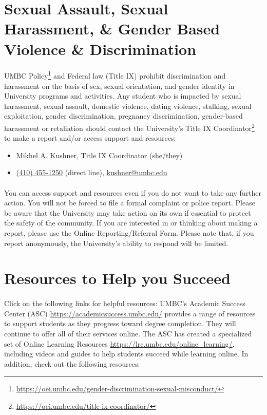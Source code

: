 \documentclass[letter,10pt]{article}
\begin{document}
\section*{Sexual Assault, Sexual Harassment, \& Gender Based Violence \& Discrimination}
\paragraph{}UMBC Policy\footnote{\url{https://oei.umbc.edu/gender-discrimination-sexual-misconduct/}} and Federal law (Title IX) prohibit discrimination and harassment on the basis of sex, sexual orientation, and gender identity in University programs and activities. Any student who is impacted by sexual harassment, sexual assault, domestic violence, dating violence, stalking, sexual exploitation, gender discrimination, pregnancy discrimination, gender-based harassment or retaliation should contact the University’s Title IX Coordinator\footnote{\url{https://oei.umbc.edu/title-ix-coordinator/}} to make a report and/or access support and resources:
\begin{itemize}
\item Mikhel A. Kushner, Title IX Coordinator (she/they)
\item \href{tel:+14104551250}{(410) 455-1250} (direct line), \href{mailto:kushner@umbc.edu?Subject=Title\%20IX}{kushner@umbc.edu}
\end{itemize}

\paragraph{}You can access support and resources even if you do not want to take any further action. You will not be forced to file a formal complaint or police report. Please be aware that the University may take action on its own if essential to protect the safety of the community. If you are interested in or thinking about making a report, please use the Online Reporting/Referral Form. Please note that, if you report anonymously,  the University’s ability to respond will be limited.

\section*{Resources to Help you Succeed}
\paragraph{}Click on the following links for helpful resources:
UMBC’s Academic Success Center (ASC) \url{https://academicsuccess.umbc.edu/} provides a range of resources to support students as they progress toward degree completion. They will continue to offer all of their services online.
The ASC has created a specialized set of Online Learning Resources \url{https://lrc.umbc.edu/online_learning/}, including videos and guides to help students succeed while learning online.
In addition, check out the following resources:
\end{document}
